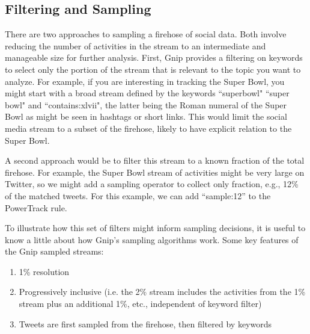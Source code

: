 \documentclass{article}
\begin{document}
\subsection{Filtering and Sampling} 

There are two approaches to sampling a firehose of social data. Both involve reducing the number of activities in the stream to an intermediate and manageable size for further analysis.  
First, Gnip provides a filtering on keywords to select only the portion of the stream that is relevant to the topic you want to analyze. For example, if you are interesting in tracking the Super Bowl, you might start with a broad stream defined by the keywords ``superbowl" ``super bowl" and ``contains:xlvii", the latter being the Roman numeral of the Super Bowl as might be seen in hashtags or short links. This would limit the social media stream to a subset of the firehose, likely to have explicit relation to the Super Bowl.

A second approach would be to filter this stream to a known fraction of the total firehose. For example, the 
Super Bowl stream of activities might be very large on Twitter, so we might add a sampling operator to collect only fraction, e.g., 12\% of the matched tweets. For this example, we can add ``sample:12'' to the PowerTrack rule.

To illustrate how this set of filters might inform sampling decisions, it is useful to know a little about how Gnip's sampling algorithms work.  Some key features of the Gnip sampled streams:

\begin{enumerate}
	\item 1\% resolution 
	\item Progressively inclusive (i.e. the 2\% stream includes the activities from the 1\% stream plus an additional 1\%, etc., independent of keyword filter)
	\item Tweets are first sampled from the firehose, then filtered by keywords 
\end{enumerate}
\end{document}
